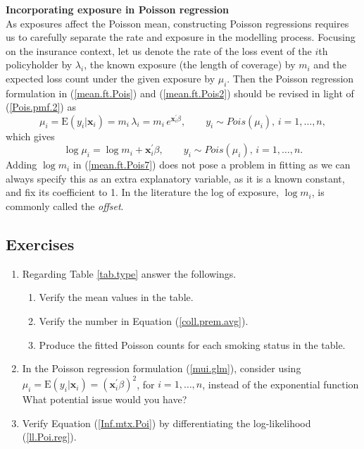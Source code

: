\documentclass[12pt]{article}
\def\E{\mathrm{E}}
\begin{document}
\noindent\textbf{Incorporating exposure in Poisson regression\\}
As exposures affect the Poisson mean, constructing Poisson regressions requires us to carefully separate the rate and exposure in the modelling process. Focusing on the insurance context, let us denote the rate of the loss event of the $i$th policyholder by $\lambda_i$, the known exposure (the length of coverage) by  $m_i$ and the expected loss count under the given exposure by $\mu_i$. Then  the Poisson regression formulation in (\ref{mean.ft.Pois}) and (\ref{mean.ft.Pois2}) 
should be revised in light of (\ref{Pois.pmf.2}) as
\begin{equation}
\label{mean.ft.Pois6}
\mu_i=\E(y_i|\mathbf{ x}_i)=m_i \,\lambda_i=m_i \, e^{\mathbf{ x}^{\prime}_i\beta}, \qquad y_i \sim Pois(\mu_i), \, i=1, \ldots, n,
\end{equation} 
which gives
\begin{equation}
\label{mean.ft.Pois7}
\log \mu_i=\log m_i+\mathbf{ x}^{\prime}_i\beta, \qquad y_i \sim Pois(\mu_i), \, i=1, \ldots, n.
\end{equation}
Adding $\log m_i$ in (\ref{mean.ft.Pois7}) does not pose a problem in fitting as we can always specify this as an extra explanatory variable, as it is a known constant, and fix its coefficient to 1. In the literature the log of exposure, $\log m_i$, is commonly called the \textit{offset}.

\subsection{Exercises}
\begin{enumerate}
  \item Regarding Table \ref{tab.type} answer the followings.
  \begin{enumerate}
  \item Verify the mean values in the table.
  \item Verify the number in Equation (\ref{coll.prem.avg}).
  \item Produce the fitted Poisson counts for each smoking status in the table.
\end{enumerate}
  \item In the Poisson regression formulation (\ref{mui.glm}), consider using $\mu_i=\E(y_i|\mathbf{ x}_i)=({\mathbf{ x}^{\prime}_i\beta})^2$, for  $i=1, \ldots, n$,  instead of the exponential function  What potential issue would you have?
  \item Verify Equation (\ref{Inf.mtx.Poi}) by differentiating the log-likelihood (\ref{ll.Poi.reg}).
\end{enumerate}
\end{document}
